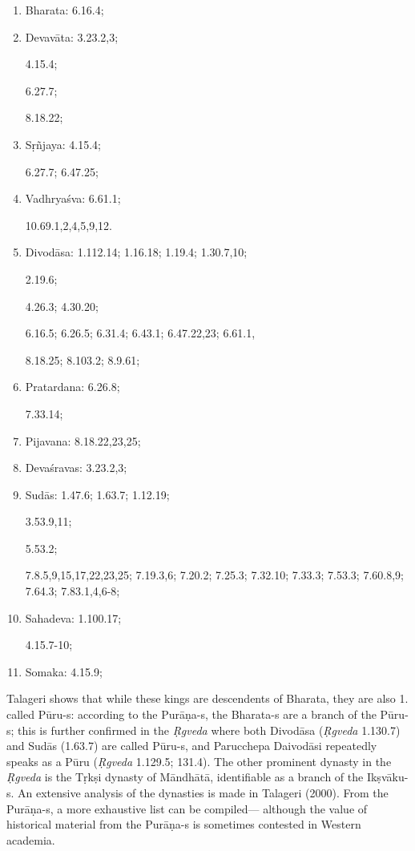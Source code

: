 \begin{enumerate}
\itemsep=1pt
\item Bharata: 6.16.4;
\item Devavāta: 3.23.2,3; 

4.15.4; 

6.27.7; 

8.18.22;

\item Sṛñjaya: 4.15.4; 

6.27.7; 6.47.25;
\item Vadhryaśva:  6.61.1; 

10.69.1,2,4,5,9,12. 
\item Divodāsa: 1.112.14; 1.16.18; 1.19.4; 1.30.7,10; 

2.19.6; 

4.26.3; 4.30.20; 

6.16.5; 6.26.5; 6.31.4; 6.43.1; 6.47.22,23; 6.61.1,

8.18.25; 8.103.2; 8.9.61;

\item Pratardana: 6.26.8; 

7.33.14;

\item Pijavana: 8.18.22,23,25;

\item Devaśravas: 3.23.2,3;

\item Sudās: 1.47.6; 1.63.7; 1.12.19;

3.53.9,11;

5.53.2;

7.8.5,9,15,17,22,23,25; 7.19.3,6; 7.20.2; 7.25.3; 7.32.10; 7.33.3; 7.53.3; 7.60.8,9; 7.64.3; 7.83.1,4,6-8; 

\item Sahadeva: 1.100.17;

4.15.7-10;
\item Somaka: 4.15.9;
\end{enumerate}

Talageri shows that while these kings are descendents of Bharata, they are also 1. called Pūru-s: according to the Purāṇa-s, the \hbox{Bharata-s} are a branch of the Pūru-s; this is further confirmed in the {\sl Ṛgveda} where both Divodāsa ({\sl Ṛgveda} 1.130.7) and Sudās (1.63.7) are called Pūru-s, and Parucchepa Daivodāsi repeatedly speaks as a Pūru ({\sl Ṛgveda} 1.129.5; 131.4). The other prominent dynasty in the {\sl Ṛgveda} is the Tṛkṣi dynasty of Māndhātā, identifiable as a branch of the Ikṣvāku-s. An extensive analysis of the dynasties is made in Talageri (2000). From the Purāṇa-s, a more exhaustive list can be compiled--- although the value of historical material from the Purāṇa-s is sometimes contested in Western academia.

